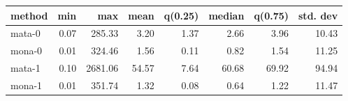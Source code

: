 \begin{tabular}{lrrrrrrr}
\hline
 method   &   min &     max &   mean &   q(0.25) &   median &   q(0.75) &   std. dev \\
\hline
 mata-0   &  0.07 &  285.33 &   3.20 &      1.37 &     2.66 &      3.96 &      10.43 \\
 mona-0   &  0.01 &  324.46 &   1.56 &      0.11 &     0.82 &      1.54 &      11.25 \\
 mata-1   &  0.10 & 2681.06 &  54.57 &      7.64 &    60.68 &     69.92 &      94.94 \\
 mona-1   &  0.01 &  351.74 &   1.32 &      0.08 &     0.64 &      1.22 &      11.47 \\
\hline
\end{tabular}

